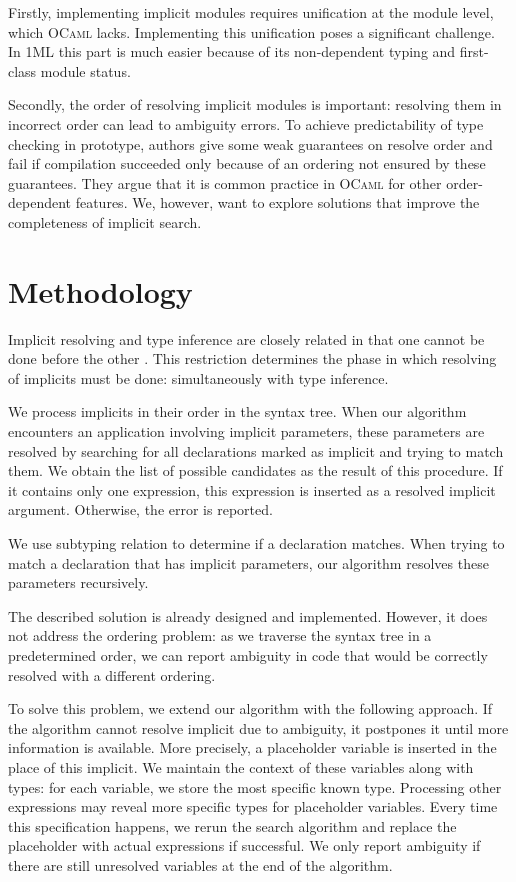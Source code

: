 \documentclass{spbau-diploma}
\begin{document}
Firstly, implementing implicit modules requires unification at the module level, which \textsc{OCaml} lacks. Implementing this unification poses a significant challenge. In \textsc{1ML} this part is much easier because of its non-dependent typing and first-class module status. 

Secondly, the order of resolving implicit modules is important: resolving them in incorrect order can lead to ambiguity errors. To achieve predictability of type checking in prototype, authors give some weak guarantees on resolve order and fail if compilation succeeded only because of an ordering not ensured by these guarantees. They argue that it is common practice in \textsc{OCaml} for other order-dependent features. We, however, want to explore solutions that improve the completeness of implicit search.

\section{Methodology}

Implicit resolving and type inference are closely related in that one cannot be done before the other \citep{white}. This restriction determines the phase in which resolving of implicits must be done: simultaneously with type inference. 

We process implicits in their order in the syntax tree. When our algorithm encounters an application involving implicit parameters, these parameters are resolved by searching for all declarations marked as implicit and trying to match them. We obtain the list of possible candidates as the result of this procedure. If it contains only one expression, this expression is inserted as a resolved implicit argument. Otherwise, the error is reported.

We use subtyping relation to determine if a declaration matches. When trying to match a declaration that has implicit parameters, our algorithm resolves these parameters recursively.

The described solution is already designed and implemented. However, it does not address the ordering problem: as we traverse the syntax tree in a predetermined order, we can report ambiguity in code that would be correctly resolved with a different ordering. 

To solve this problem, we extend our algorithm with the following approach. If the algorithm cannot resolve implicit due to ambiguity, it postpones it until more information is available. More precisely, a placeholder variable is inserted in the place of this implicit. We maintain the context of these variables along with types: for each variable, we store the most specific known type. Processing other expressions may reveal more specific types for placeholder variables. Every time this specification happens, we rerun the search algorithm and replace the placeholder with actual expressions if successful. We only report ambiguity if there are still unresolved variables at the end of the algorithm.
\end{document}
